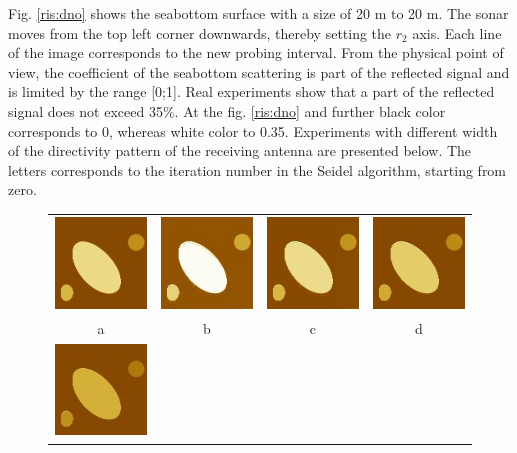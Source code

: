 \documentclass{procDDs}
\begin{document}
Fig. \ref{ris:dno} shows the seabottom surface with a size of 20 m to 20 m. The sonar moves from the top left corner downwards, thereby setting the $ r_2 $ axis. Each line of the image corresponds to the new probing interval. From the physical point of view, the coefficient of the seabottom scattering is part of the reflected signal and is limited by the range [0;1]. Real experiments show that a part of the reflected signal does not exceed 35\%. At the fig. \ref{ris:dno} and further black color corresponds to 0, whereas white color to 0.35. Experiments with different width of the directivity pattern of the receiving antenna are presented below. The letters corresponds to the iteration number in the Seidel algorithm, starting from zero.

\begin{figure}[h!]\center%
	\begin{tabular}{cccc}
		\includegraphics[width=0.2\linewidth]{img/5/1.jpg}&
		\includegraphics[width=0.2\linewidth]{img/5/3.jpg}&
		\includegraphics[width=0.2\linewidth]{img/5/4.jpg}&
		\includegraphics[width=0.2\linewidth]{img/5/5.jpg}\\
		a & b & c & d \\
		\includegraphics[width=0.2\linewidth]{img/5/6.jpg}&

\end{tabular}
\end{figure}
\end{document}
